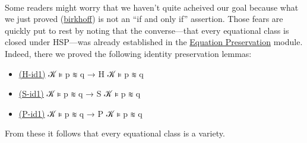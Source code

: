 \begin{code}
\AgdaSpace{}%
\AgdaSpace{}%
\AgdaSpace{}%
\<%
\\
%
\\[\AgdaEmptyExtraSkip]%
%
\>[3]\AgdaSpace{}%
\AgdaSymbol{:}\AgdaSpace{}%
\AgdaSpace{}%
\AgdaSpace{}%
\<%
\\
%
\>[3]\AgdaSpace{}%
\AgdaSymbol{=}\AgdaSpace{}%
\AgdaSymbol{(}\AgdaSpace{}%
\AgdaOperator{\AgdaInductiveConstructor{,}}\AgdaSpace{}%
\AgdaSpace{}%
\AgdaSpace{}%
\AgdaSpace{}%
\AgdaSpace{}%
\AgdaOperator{\AgdaInductiveConstructor{,}}\AgdaSpace{}%
\AgdaSymbol{(}\AgdaSpace{}%
\AgdaSpace{}%
\AgdaSpace{}%
\AgdaSpace{}%
\AgdaOperator{\AgdaInductiveConstructor{,}}\AgdaSpace{}%
\AgdaSpace{}%
\AgdaSymbol{)}\AgdaSpace{}%
\AgdaSymbol{)}\AgdaSpace{}%
\AgdaOperator{\AgdaInductiveConstructor{,}}\AgdaSpace{}%
\<%
\\
%
\\[\AgdaEmptyExtraSkip]%
%
\>[3]\AgdaSpace{}%
\AgdaSymbol{:}\AgdaSpace{}%
\AgdaSpace{}%
\AgdaSpace{}%
\<%
\\
%
\>[3]\AgdaSpace{}%
\AgdaSymbol{=}\AgdaSpace{}%
\AgdaSpace{}%
\AgdaSymbol{(}\AgdaSpace{}%
\AgdaSymbol{)}\AgdaSpace{}%
\<%
\end{code}
\ccpad
Some readers might worry that we haven't quite acheived our goal because what we just proved (\href{https://ualib.gitlab.io/UALib.Birkhoff.Theorem.html#1487}{birkhoff}) is not an ``if and only if'' assertion. Those fears are quickly put to rest by noting that the converse---that every equational class is closed under HSP---was already established in the \href{UALib.Varieties.Preservation.html}{Equation Preservation} module. Indeed, there we proved the following identity preservation lemmas:
\begin{itemize}
\item \href{https://ualib.gitlab.io/UALib.Varieties.Preservation.html#964}{(H-id1)} 𝒦 ⊧ p ≋ q → H 𝒦 ⊧ p ≋ q
\item \href{https://ualib.gitlab.io/UALib.Varieties.Preservation.html#2592}{(S-id1)} 𝒦 ⊧ p ≋ q → S 𝒦 ⊧ p ≋ q
\item \href{https://ualib.gitlab.io/UALib.Varieties.Preservation.html#4111}{(P-id1)} 𝒦 ⊧ p ≋ q → P 𝒦 ⊧ p ≋ q
\end{itemize}
From these it follows that every equational class is a variety.
